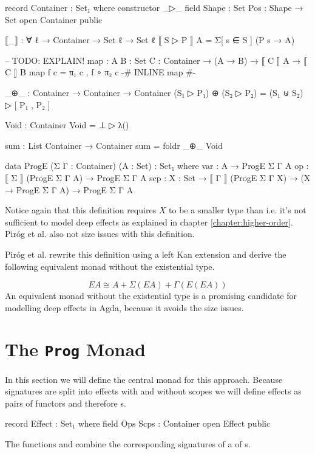 \begin{code}[hide]
record Container : Set₁ where
  constructor _▷_
  field
    Shape : Set
    Pos : Shape → Set
open Container public

⟦_⟧ : ∀ {ℓ} → Container → Set ℓ → Set ℓ
⟦ S ▷ P ⟧ A = Σ[ s ∈ S ] (P s → A)

-- TODO: EXPLAIN!
map : {A B : Set} {C : Container} → (A → B) → ⟦ C ⟧ A → ⟦ C ⟧ B
map f c = π₁ c , f ∘ π₂ c
{-# INLINE map #-}

_⊕_ : Container → Container → Container
(S₁ ▷ P₁) ⊕ (S₂ ▷ P₂) = (S₁ ⊎ S₂) ▷ [ P₁ , P₂ ]

Void : Container
Void = ⊥ ▷ λ()

sum : List Container → Container
sum = foldr _⊕_ Void

\end{code}
\begin{code}
data ProgE (Σ Γ : Container) (A : Set) : Set₁ where
  var  : A → ProgE Σ Γ A
  op   : ⟦ Σ ⟧ (ProgE Σ Γ A) → ProgE Σ Γ A
  scp  : {X : Set} → ⟦ Γ ⟧ (ProgE Σ Γ X) → (X → ProgE Σ Γ A) → ProgE Σ Γ A
\end{code}
Notice again that this definition requires $X$ to be a smaller type than
 i.e. it's not sufficient to model deep effects as explained in
chapter \ref{chapter:higher-order}.
Piróg et al. also not size issues with this definition.

Piróg et al. rewrite this definition using a left Kan extension and derive the
following equivalent monad without the existential type.

\[
  EA \cong A + \Sigma{}(EA) + \Gamma{}(E(EA))
\]
An equivalent monad without the existential type is a promising candidate for
modelling deep effects in Agda, because it avoids the size issues.

\section{The \texttt{Prog} Monad}

In this section we will define the central monad for this approach.
Because signatures are split into effects with and without scopes we will define
effects as pairs of functors and therefore s.

\begin{code}
record Effect : Set₁ where
  field
    Ops Scps : Container
open Effect public
\end{code}
The functions  and  combine the
corresponding signatures of a  of s.

